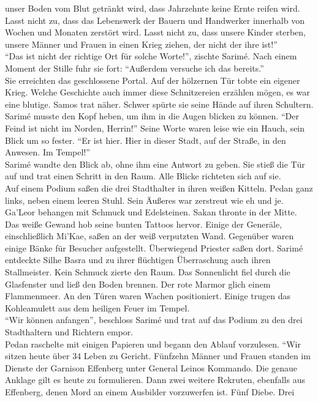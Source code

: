 unser Boden vom Blut getränkt wird, dass Jahrzehnte keine Ernte reifen wird. Lasst nicht zu, dass 
das Lebenswerk der Bauern und Handwerker innerhalb von Wochen und Monaten zerstört wird. Lasst 
nicht zu, dass unsere Kinder sterben, unsere Männer und Frauen in einen Krieg ziehen, der nicht der 
ihre ist!''\\
``Das ist nicht der richtige Ort für solche Worte!'', zischte Sarimé. Nach einem Moment der Stille 
fuhr sie fort: ``Außerdem versuche ich das bereits.''\\
Sie erreichten das geschlossene Portal. Auf der hölzernen Tür tobte ein eigener Krieg. Welche 
Geschichte auch immer diese Schnitzereien erzählen mögen, es war eine blutige. Samos trat näher. 
Schwer spürte sie seine Hände auf ihren Schultern. Sarimé musste den Kopf heben, um ihm in die 
Augen blicken zu können. ``Der Feind ist nicht im Norden, Herrin!'' Seine Worte waren leise wie ein 
Hauch, sein Blick um so fester. ``Er ist hier. Hier in dieser Stadt, auf der Straße, in den 
Anwesen. Im Tempel!''\\
Sarimé wandte den Blick ab, ohne ihm eine Antwort zu geben. Sie stieß die Tür auf und trat einen 
Schritt in den Raum. Alle Blicke richteten sich auf sie.\\
Auf einem Podium saßen die drei Stadthalter in ihren weißen Kitteln. Pedan ganz links, neben einem 
leeren Stuhl. Sein Äußeres war zerstreut wie eh und je. Ga'Leor behangen mit Schmuck und 
Edelsteinen. Sakan thronte in der Mitte. Das weiße Gewand hob seine bunten Tattoos hervor. Einige 
der Generäle, einschließlich Mi'Kae, saßen an der weiß verputzten Wand. Gegenüber waren einige Bänke 
für Besucher aufgestellt. Überwiegend Priester saßen dort. Sarimé entdeckte Silhe Basra und zu 
ihrer flüchtigen Überraschung auch ihren Stallmeister. Kein Schmuck zierte den Raum. Das 
Sonnenlicht fiel durch die Glasfenster und ließ den Boden brennen. Der rote Marmor glich einem 
Flammenmeer. An den Türen waren Wachen positioniert. Einige trugen das Kohleamulett aus dem heiligen 
Feuer im Tempel.\\
``Wir können anfangen'', beschloss Sarimé und trat auf das Podium zu den drei Stadthaltern und 
Richtern empor.\\
Pedan raschelte mit einigen Papieren und begann den Ablauf vorzulesen. ``Wir sitzen heute über 34 
Leben zu Gericht. Fünfzehn Männer und Frauen standen im Dienste der Garnison Effenberg unter 
General Leinos Kommando. Die genaue Anklage gilt es heute zu formulieren. Dann zwei weitere 
Rekruten, ebenfalls aus Effenberg, denen Mord an einem Ausbilder vorzuwerfen ist. Fünf Diebe. Drei 
